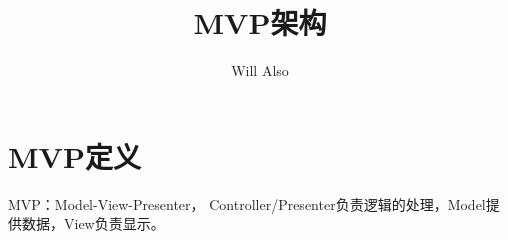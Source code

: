 \documentclass[]{ctexart}
\title{MVP架构}
\author{Will Also}
\begin{document}
\maketitle
\tableofcontents

\section{MVP定义}
MVP：Model-View-Presenter，
Controller/Presenter负责逻辑的处理，Model提供数据，View负责显示。
\end{document}
